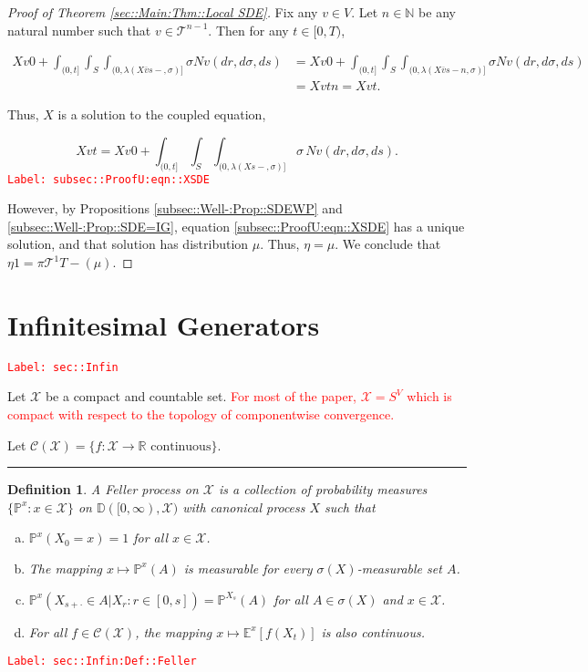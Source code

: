 \documentclass[12pt]{article}
\newcommand{\mb}{\mathbb}
\newcommand{\mc}{\mathcal}
\newcommand{\ra}{\rightarrow}
\newcommand{\ov}{\overline}
\newcommand{\te}{\text}
\newcommand{\tr}{\textcolor{red}}
\newcommand{\labe}[1]{\tr{\texttt{Label: #1}}}
\newcommand{\ind}{\hspace{24pt}}
\newcommand{\lin}{\rule{\linewidth}{0.4 pt}}
\newcommand{\pr}{\mb{P}}							%
\newcommand{\cad}{\mb{D}}							%
\renewcommand{\v}{v}							%
\renewcommand{\S}{S}							%
\newcommand{\s}{\sigma}							%
\newcommand{\T}{T}								%
\renewcommand{\t}{t}							%
\newcommand{\proj}{\pi}							%
\renewcommand{\tt}{s}							%
\newcommand{\X}{X}								%
\newcommand{\cl}{\ov}							%
\newcommand{\tree}{\mc{T}}						%
\newcommand{\sln}[1]{^{#1}}						%
\newcommand{\poiss}{N}							%
\newcommand{\rate}{\lambda}						%
\renewcommand{\r}{r}							%
\newcommand{\m}{\mu}							%
\newcommand{\mmm}{\eta}							%
\newtheorem{defn}[thms]{Definition}
\begin{document}
\begin{proof}[Proof of Theorem \ref{sec::Main:Thm::Local SDE}]
\ind Fix any \(\v\in V\). Let \(n\in \mb{N}\) be any natural number such that \(\v\in \tree\sln{n-1}\). Then for any \(\t \in [0,\T)\),

\begin{align*}
\X{\v}{0} + \int_{(0,\t]}\int_\S\int_{(0,\rate{}(\X{\cl{\v}}{\tt-},\s)]}\s\poiss{\v}(d\r,d\s,d\tt) &= \X{\v}{0} + \int_{(0,\t]}\int_\S\int_{(0,\rate{}(\X{\cl{\v}}{\tt-}{n},\s)]}\s\poiss{\v}(d\r,d\s,d\tt)\\
&=\X{\v}{\t}{n} = \X{\v}{\t}.
\end{align*}

Thus, \(\X{}{}\) is a solution to the coupled equation,

\begin{equation}
\X{\v}{\t} = \X{\v}{0} + \int_{(0,\t]}\int_\S \int_{(0,\rate{}(\X{}{\tt-},\s)]}\s\,\poiss{\v}(d\r,d\s,d\tt).
\label{subsec::ProofU:eqn::XSDE}
\end{equation}
\labe{subsec::ProofU:eqn::XSDE}

However, by Propositions \ref{subsec::Well-:Prop::SDEWP} and \ref{subsec::Well-:Prop::SDE=IG}, equation \eqref{subsec::ProofU:eqn::XSDE} has a unique solution, and that solution has distribution \(\m{}{}{}\). Thus, \(\mmm{}{}{} = \m{}{}{}\). We conclude that \(\mmm{}{}{1} = \proj{\tree\sln{1}}{\T-}(\m{}{}{})\).

\end{proof}
\newpage
\appendix

\section{Infinitesimal Generators}
\label{sec::Infin}\labe{sec::Infin}

Let \(\mc{X}\) be a compact and countable set. \tr{For most of the paper, \(\mc{X} = S^V\) which is compact with respect to the topology of componentwise convergence.}

Let \(\mc{C}(\mc{X})= \{f:\mc{X} \ra \mb{R} \te{ continuous}\}\).

\lin

\begin{defn}
A Feller process on \(\mc{X}\) is a collection of probability measures \(\{\pr^x:x \in \mc{X}\}\) on \(\cad([0,\infty),\mc{X})\) with canonical process \(X\) such that

\begin{enumerate}[(a)]
\item \(\pr^x(X_0 = x) = 1\) for all \(x \in \mc{X}\).

\item The mapping \(x \mapsto \pr^x(A)\) is measurable for every \(\sigma(X)\)-measurable set \(A\).

\item \(\pr^x(X_{s+\cdot} \in A|X_r:r \in [0,s]) = \pr^{X_s}(A)\) for all \(A \in \sigma(X)\) and \(x \in \mc{X}\).

\item For all \(f\in \mc{C}(\mc{X})\), the mapping \(x\mapsto \mb{E}^x[f(X_t)]\) is also continuous.
\end{enumerate}
\label{sec::Infin:Def::Feller}
\end{defn}
\labe{sec::Infin:Def::Feller}
\end{document}

